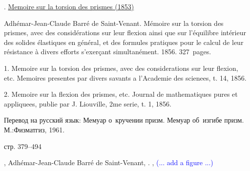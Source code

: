 

\label{para:twistingofrods.saintvenant}

\begin{otherlanguage}{russian}

{\small


.
\href{https://babel.hathitrust.org/cgi/pt?id=hvd.32044091959866&seq=7}{Memoire sur la torsion des prismes (1853)}

Adhémar-Jean-Claude Barré de Saint\hbox{-\hspace{-0.2ex}}Venant.
Mémoire sur la torsion des prismes, avec des considérations sur leur flexion ainsi que sur l'équilibre intérieur des solides élastiques en général, et des formules pratiques pour le calcul de leur résistance à divers efforts s’exerçant simultanément.
1856.
327~pages.

1. Memoire sur la torsion des prismes, avec des considerations sur leur flexion, etc. Memoires presentes par divers savants a l'Academie des scienees, t. 14, 1856.

2. Memoire sur la flexion des prismes, etc. Journal de mathematiques pures et appliquees, publie par J. Liouville, 2me serie, t. 1, 1856.

Перевод на русский язык:
 Мемуар о~кручении призм. Мемуар об~изгибе призм. М.:\;Физ\-мат\-гиз, 1961.

стр. 379--494
\par}

\end{otherlanguage}

,
Adhémar-Jean-Claude Barré de Saint\hbox{-\hspace{-0.2ex}}Venant,
.
 
,
\textcolor{blue}{(... add a figure ...)}

